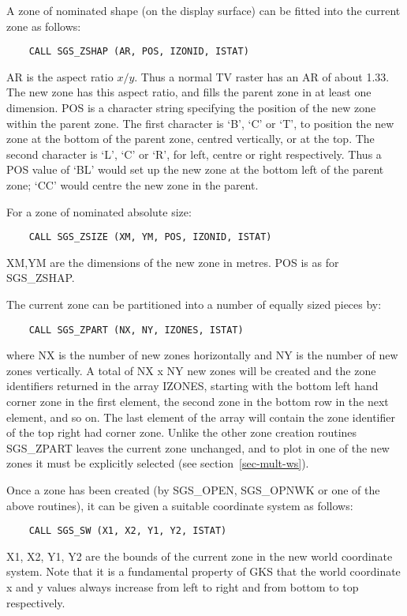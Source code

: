 A zone of nominated shape (on the
display surface) can be fitted into the current zone as
follows:
\begin{verbatim}
    CALL SGS_ZSHAP (AR, POS, IZONID, ISTAT)
\end{verbatim}
AR is the aspect ratio $x/y$.  Thus a normal TV raster has an
AR of about 1.33.  The new zone has this aspect ratio,
and fills the parent zone in at least one dimension.  POS
is a character string specifying the position of the new zone
within the parent zone.  The first character is `B', `C'
or `T', to position the new zone at the bottom of the
parent zone, centred vertically, or at the top.  The second character
is `L', `C' or
`R', for left, centre or right respectively.  Thus a POS value
of `BL' would set up the new zone at the bottom left of
the parent zone;  `CC' would centre the new zone in the parent.

For a zone of nominated absolute size:
\begin{verbatim}
    CALL SGS_ZSIZE (XM, YM, POS, IZONID, ISTAT)
\end{verbatim}
XM,YM are the dimensions of the new zone in metres.  POS is as for
SGS\_ZSHAP.

The current zone can be partitioned into a number of equally sized pieces
by:
\begin{verbatim}
    CALL SGS_ZPART (NX, NY, IZONES, ISTAT)
\end{verbatim}
where NX is the number of new zones horizontally and NY is the number of new
zones vertically.  A total of NX x NY new zones will be created and the zone
identifiers
returned in the array IZONES, starting with the bottom left hand corner zone in
the first element, the second zone in the bottom row in the next element, and
so on.  The last element of the array will contain the zone
identifier of the top right
had corner zone.  Unlike the other zone creation routines SGS\_ZPART leaves the
current zone unchanged, and to plot in one of the new zones it must be
explicitly selected (see section~\ref{sec-mult-ws}).

Once a zone has been created (by SGS\_OPEN, SGS\_OPNWK or one of the
above routines), it can be given a suitable coordinate
system as follows:
\begin{verbatim}
    CALL SGS_SW (X1, X2, Y1, Y2, ISTAT)
\end{verbatim}
X1, X2, Y1, Y2 are the bounds of the current zone in the new
world coordinate system.  Note that it is a fundamental property of GKS that
the world coordinate x and y values always increase from left to right and
from bottom to top respectively.

